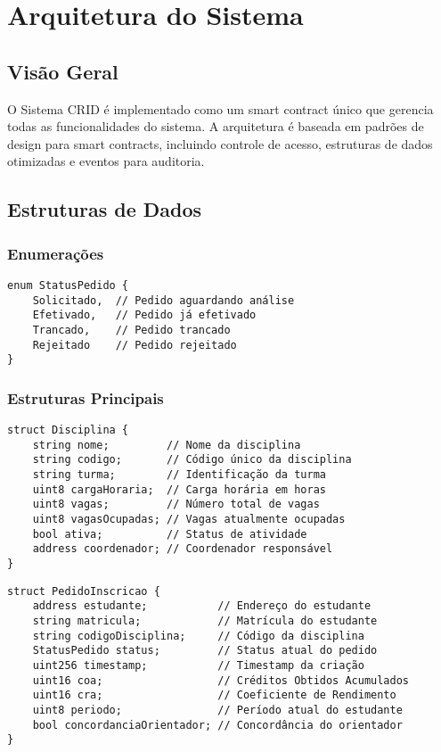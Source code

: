 \documentclass[12pt,a4paper]{article}
\begin{document}
\section{Arquitetura do Sistema}

\subsection{Visão Geral}

O Sistema CRID é implementado como um smart contract único que gerencia todas as funcionalidades do sistema. A arquitetura é baseada em padrões de design para smart contracts, incluindo controle de acesso, estruturas de dados otimizadas e eventos para auditoria.

\subsection{Estruturas de Dados}

\subsubsection{Enumerações}

\begin{lstlisting}[caption=Enumeração StatusPedido]
enum StatusPedido {
    Solicitado,  // Pedido aguardando análise
    Efetivado,   // Pedido já efetivado
    Trancado,    // Pedido trancado
    Rejeitado    // Pedido rejeitado
}
\end{lstlisting}

\subsubsection{Estruturas Principais}

\begin{lstlisting}[caption=Estrutura Disciplina]
struct Disciplina {
    string nome;         // Nome da disciplina
    string codigo;       // Código único da disciplina
    string turma;        // Identificação da turma
    uint8 cargaHoraria;  // Carga horária em horas
    uint8 vagas;         // Número total de vagas
    uint8 vagasOcupadas; // Vagas atualmente ocupadas
    bool ativa;          // Status de atividade
    address coordenador; // Coordenador responsável
}
\end{lstlisting}

\begin{lstlisting}[caption=Estrutura PedidoInscricao]
struct PedidoInscricao {
    address estudante;           // Endereço do estudante
    string matricula;            // Matrícula do estudante
    string codigoDisciplina;     // Código da disciplina
    StatusPedido status;         // Status atual do pedido
    uint256 timestamp;           // Timestamp da criação
    uint16 coa;                  // Créditos Obtidos Acumulados
    uint16 cra;                  // Coeficiente de Rendimento
    uint8 periodo;               // Período atual do estudante
    bool concordanciaOrientador; // Concordância do orientador
}
\end{lstlisting}
\end{document}
